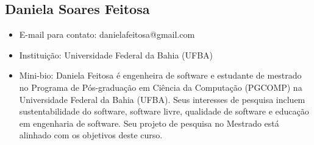 \subsection*{Daniela Soares Feitosa}
    \begin{itemize}
        \item E-mail para contato: danielafeitosa@gmail.com
        \item Instituição: Universidade Federal da Bahia (UFBA)
        \item Mini-bio: Daniela Feitosa é engenheira de software e estudante de mestrado
        no Programa de Pós-graduação em Ciência da Computação (PGCOMP) na Universidade Federal da Bahia (UFBA). Seus interesses de pesquisa incluem sustentabilidade do software, software livre, qualidade de software e educação em engenharia de software. Seu projeto de pesquisa no Mestrado está alinhado com os objetivos deste curso.    
    \end{itemize}